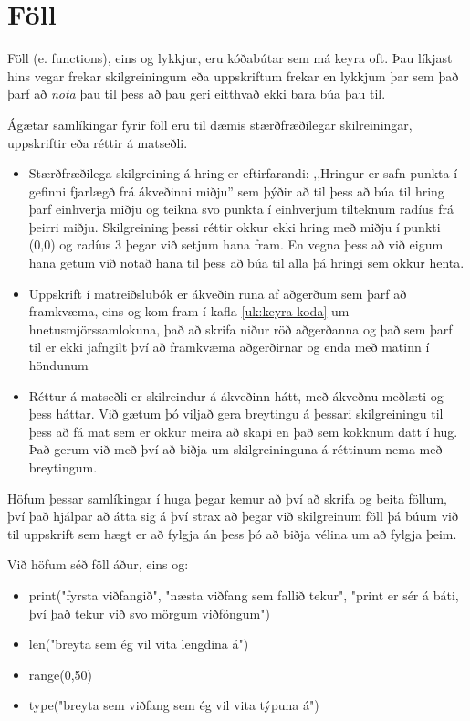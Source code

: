 
\chapter{Föll}\label{k:föll}
Föll (e. functions), eins og lykkjur, eru kóðabútar sem má keyra oft.
Þau líkjast hins vegar frekar skilgreiningum eða uppskriftum frekar en lykkjum þar sem það þarf að \emph{nota} þau til þess að þau geri eitthvað ekki bara búa þau til.

Ágætar samlíkingar fyrir föll eru til dæmis stærðfræðilegar skilreiningar, uppskriftir eða réttir á matseðli.

\begin{itemize}
	\item Stærðfræðilega skilgreining á hring er eftirfarandi: ,,Hringur er safn punkta í gefinni fjarlægð frá ákveðinni miðju'' sem þýðir að til þess að búa til hring þarf einhverja miðju og teikna svo punkta í einhverjum tilteknum radíus frá þeirri miðju.
	Skilgreining þessi réttir okkur ekki hring með miðju í punkti (0,0) og radíus 3 þegar við setjum hana fram.
	En vegna þess að við eigum hana getum við notað hana til þess að búa til alla þá hringi sem okkur henta.
	\item Uppskrift í matreiðslubók er ákveðin runa af aðgerðum sem þarf að framkvæma, eins og kom fram í kafla \ref{uk:keyra-koda} um hnetusmjörssamlokuna, það að skrifa niður röð aðgerðanna og það sem þarf til er ekki jafngilt því að framkvæma aðgerðirnar og enda með matinn í höndunum
	\item Réttur á matseðli er skilreindur á ákveðinn hátt, með ákveðnu meðlæti og þess háttar.
	Við gætum þó viljað gera breytingu á þessari skilgreiningu til þess að fá mat sem er okkur meira að skapi en það sem kokknum datt í hug.
	Það gerum við með því að biðja um skilgreininguna á réttinum nema með breytingum.
\end{itemize}

Höfum þessar samlíkingar í huga þegar kemur að því að skrifa og beita föllum, því það hjálpar að átta sig á því strax að þegar við skilgreinum föll þá búum við til uppskrift sem hægt er að fylgja án þess þó að biðja vélina um að fylgja þeim.

Við höfum séð föll áður, eins og: 

\begin{itemize}
	\item print("fyrsta viðfangið", "næsta viðfang sem fallið tekur", "print er sér á báti, því það tekur við svo mörgum viðföngum")
	\item len("breyta sem ég vil vita lengdina á")
	\item range(0,50)
	\item type("breyta sem viðfang sem ég vil vita týpuna á")
\end{itemize}

